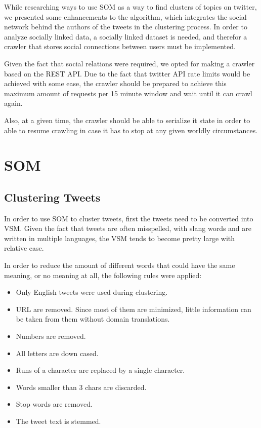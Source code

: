 While researching ways to use \ac{SOM} as a way to find clusters of topics on twitter, we presented some enhancements to the algorithm, which integrates the social network behind the authors of the tweets in the clustering process. In order to analyze socially linked data, a socially linked dataset is needed, and therefor a crawler that stores social connections between users must be implemented.   

Given the fact that social relations were required, we opted for making a crawler based on the REST API. Due to the fact that twitter API rate limits would be achieved with some ease, the crawler should be prepared to achieve this maximum amount of requests per 15 minute window and wait until it can crawl again. 

Also, at a given time, the crawler should be able to serialize it state in order to able to resume crawling in case it has to stop at any given worldly circumstances. 

\section{SOM}

\subsection{Clustering Tweets}
\label{sub:clustering_tweets}

In order to use \ac{SOM} to cluster tweets, first the tweets need to be converted into \ac{VSM}. Given the fact that tweets are often misspelled, with slang words and are written in multiple languages, the \ac{VSM} tends to become pretty large with relative ease. 

In order to reduce the amount of different words that could have the same meaning, or no meaning at all, the following rules were applied:

\begin{itemize}
  \item Only English tweets were used during clustering.
  \item \ac{URL} are removed. Since most of them are minimized, little information can be taken from them without domain translations.
  \item Numbers are removed.
  \item All letters are down cased.
  \item Runs of a character are replaced by a single character.
  \item Words smaller than 3 chars are discarded.
  \item Stop words are removed. 
  \item The tweet text is stemmed.
\end{itemize}

